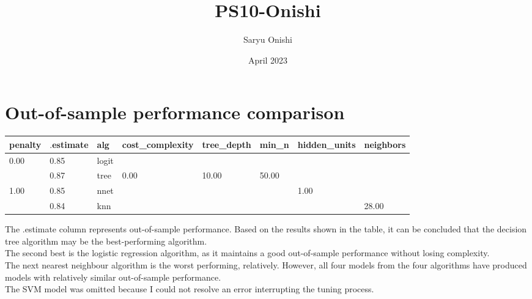 \documentclass[12pt,english]{exam}
\begin{document}
\title{PS10-Onishi}
\author{Saryu Onishi}
\date{April 2023}
\maketitle

\section{Out-of-sample performance comparison}
\begin{table}
\centering
\begin{tabular}[h]{|llllllll|}
\toprule
penalty & $.$estimate & alg & cost\_complexity & tree\_depth & min\_n & hidden\_units & neighbors\\
\midrule
0.00 & 0.85 & logit &  &  &  &  & \\
 & 0.87 & tree & 0.00 & 10.00 & 50.00 &  & \\
1.00 & 0.85 & nnet &  &  &  & 1.00 & \\
 & 0.84 & knn &  &  &  &  & 28.00\\
\bottomrule
\end{tabular}
\end{table}
The .estimate column represents out-of-sample performance. Based on the results shown in the table, it can be concluded that the decision tree algorithm may be the best-performing algorithm. \\ The second best is the logistic regression algorithm, as it maintains a good out-of-sample performance without losing complexity. \\ The next nearest neighbour algorithm is the worst performing, relatively. However, all four models from the four algorithms have produced models with relatively similar out-of-sample performance.\\
The SVM model was omitted because I could not resolve an error interrupting the tuning process.
\end{document}
